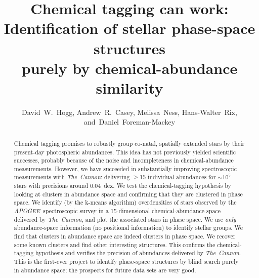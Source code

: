 \documentclass[12pt, letterpaper, preprint]{aastex}
\newcommand{\acronym}[1]{{\small{#1}}}
\newcommand{\project}[1]{\textsl{#1}}
\newcommand{\apogee}{\project{\acronym{APOGEE}}}
\newcommand{\thecannon}{\project{The~Cannon}}
\begin{document}
\sloppy\sloppypar

\title{Chemical tagging can work: \\
       Identification of stellar phase-space structures \\
       purely by chemical-abundance similarity}
\author{David~W.~Hogg,
        Andrew~R.~Casey,
        Melissa~Ness,
        Hans-Walter~Rix,
    and~Daniel~Foreman-Mackey}


\begin{abstract}
Chemical tagging promises to robustly group co-natal, spatially extended stars by their present-day  photospheric abundances.
This idea has not previously yielded scientific successes, probably because of the
noise and incompleteness in chemical-abundance measurements.
However, we have succeeded in substantially improving spectroscopic measurements with \thecannon: 
delivering $\geq$15 individual abundances for $\sim10^5$ stars with precisions around 0.04~dex.
We test the chemical-tagging hypothesis by looking at clusters in abundance space
and confirming that they are clustered in phase space.
We identify (by the k-means algorithm) overdensities of stars observed by the \apogee\ spectroscopic survey
in a 15-dimensional chemical-abundance space delivered by \thecannon,
and plot the associated stars in phase space.
We use \emph{only} abundance-space information (no positional information) to identify stellar groups.
We find that clusters in abundance space are indeed clusters in phase space.
We recover some known clusters and find other interesting structures.
This confirms the chemical-tagging hypothesis and verifies the precision of abundances delivered by \thecannon.
This is the first-ever project to identify phase-space structures by blind search purely in abundance space;
the prospects for future data sets are very good.
\end{abstract}
\end{document}
